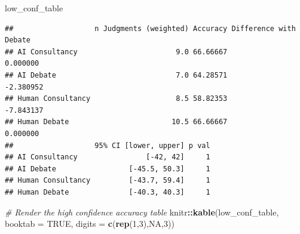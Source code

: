 \documentclass[
]{article}
\newenvironment{Shaded}{\begin{snugshade}}{\end{snugshade}}
\newcommand{\AttributeTok}[1]{\textcolor[rgb]{0.13,0.29,0.53}{#1}}
\newcommand{\CommentTok}[1]{\textcolor[rgb]{0.56,0.35,0.01}{\textit{#1}}}
\newcommand{\ConstantTok}[1]{\textcolor[rgb]{0.56,0.35,0.01}{#1}}
\newcommand{\DecValTok}[1]{\textcolor[rgb]{0.00,0.00,0.81}{#1}}
\newcommand{\FunctionTok}[1]{\textcolor[rgb]{0.13,0.29,0.53}{\textbf{#1}}}
\newcommand{\NormalTok}[1]{#1}
\newcommand{\SpecialCharTok}[1]{\textcolor[rgb]{0.81,0.36,0.00}{\textbf{#1}}}
\begin{document}
\begin{Shaded}
\begin{Highlighting}[]
\NormalTok{low\_conf\_table}
\end{Highlighting}
\end{Shaded}

\begin{verbatim}
##                   n Judgments (weighted) Accuracy Difference with Debate
## AI Consultancy                       9.0 66.66667               0.000000
## AI Debate                            7.0 64.28571              -2.380952
## Human Consultancy                    8.5 58.82353              -7.843137
## Human Debate                        10.5 66.66667               0.000000
##                   95% CI [lower, upper] p val
## AI Consultancy                [-42, 42]     1
## AI Debate                 [-45.5, 50.3]     1
## Human Consultancy         [-43.7, 59.4]     1
## Human Debate              [-40.3, 40.3]     1
\end{verbatim}

\begin{Shaded}
\begin{Highlighting}[]
\CommentTok{\# Render the high confidence accuracy table}
\NormalTok{knitr}\SpecialCharTok{::}\FunctionTok{kable}\NormalTok{(low\_conf\_table, }\AttributeTok{booktab =} \ConstantTok{TRUE}\NormalTok{, }\AttributeTok{digits =} \FunctionTok{c}\NormalTok{(}\FunctionTok{rep}\NormalTok{(}\DecValTok{1}\NormalTok{,}\DecValTok{3}\NormalTok{),}\ConstantTok{NA}\NormalTok{,}\DecValTok{3}\NormalTok{))}
\end{Highlighting}
\end{Shaded}
\end{document}
